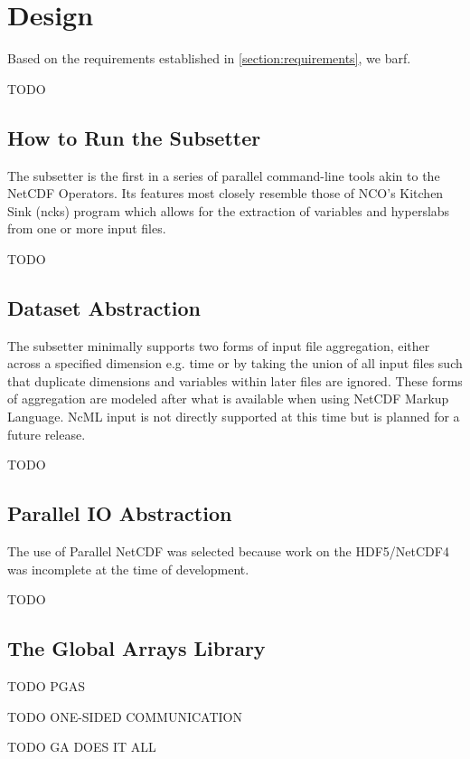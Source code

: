\section{Design}
\label{section:design}

Based on the requirements established in \ref{section:requirements}, we barf.

TODO

\subsection{How to Run the Subsetter}

The subsetter is the first in a series of parallel command-line tools
akin to the NetCDF Operators.\cite{NCO}  Its features most closely resemble
those of NCO's Kitchen Sink (ncks) program which allows for the extraction of
variables and hyperslabs from one or more input files.

TODO

\subsection{Dataset Abstraction}

The subsetter minimally supports two forms of input file aggregation, either
across a specified dimension e.g. time or by taking the union of all input
files such that duplicate dimensions and variables within later files are
ignored.  These forms of aggregation are modeled after what is available when
using NetCDF Markup Language.\cite{NcML} NcML input is not directly supported
at this time but is planned for a future release. 

TODO

\subsection{Parallel IO Abstraction}

The use of Parallel NetCDF was selected because work on the HDF5/NetCDF4 was
incomplete at the time of development.

TODO

\subsection{The Global Arrays Library}

TODO PGAS

TODO ONE-SIDED COMMUNICATION

TODO GA DOES IT ALL
